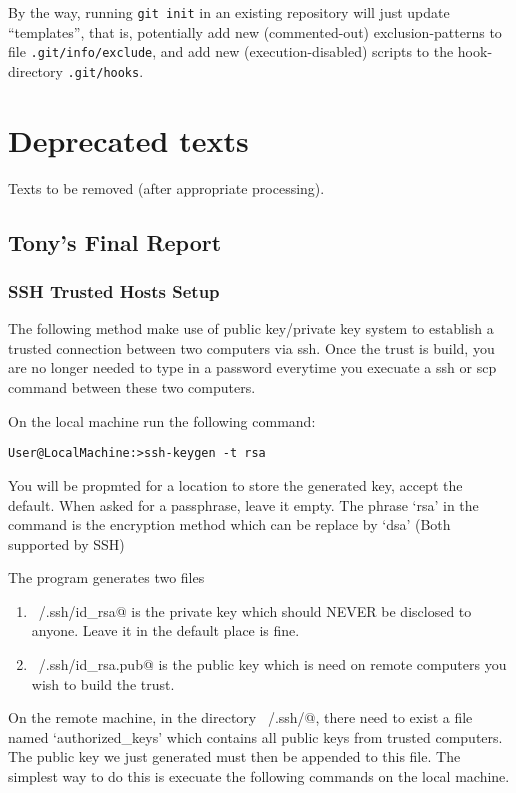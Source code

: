 \documentclass{book}
\newcommand{\filename}[1]{\texttt{#1}}
\begin{document}
By the way, running \texttt{git init} in an existing repository will just update ``templates'', that is, potentially add new (commented-out) exclusion-patterns to file \filename{.git/info/exclude}, and add new (execution-disabled) scripts to the hook-directory \filename{.git/hooks}.



\part{Deprecated texts}
\label{par:Deprecatedtexts}

Texts to be removed (after appropriate processing).


\chapter{Tony's Final Report}
\label{cha:finalreport}

\section{SSH Trusted Hosts Setup}
\label{sec:finalreportssh}

The following method make use of public key/private key system to establish a trusted connection between two computers via ssh. Once the trust is build, you are no longer needed to type in a password everytime you execuate a ssh or scp command between these two computers.  

On the local machine run the following command:

\verb!User@LocalMachine:>ssh-keygen -t rsa!

You will be propmted for a location to store the generated key, accept the default. When asked for a passphrase, leave it empty. The phrase `rsa' in the command is the encryption method which can be replace by `dsa' (Both supported by SSH)

The program generates two files

\begin{enumerate}
\item \verb@~/.ssh/id_rsa@ is the private key which should NEVER be disclosed to anyone. Leave it in the default place is fine.
\item \verb@~/.ssh/id_rsa.pub@ is the public key which is need on remote computers you wish to build the trust.
\end{enumerate}

On the remote machine, in the directory \verb@~/.ssh/@, there need to exist a file named `authorized\_keys' which contains all  
public keys from trusted computers. The public key we just generated must then be appended to this file. The simplest way to do this is execuate the following commands on the local machine.
\end{document}
